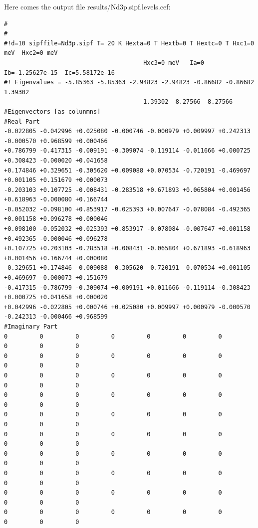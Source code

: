 \begin{enumerate}
Here comes the output file {\prg results/Nd3p.sipf.levels.cef}:
{\footnotesize
\begin{verbatim} 
#
#
#!d=10 sipffile=Nd3p.sipf T= 20 K Hexta=0 T Hextb=0 T Hextc=0 T Hxc1=0 meV  Hxc2=0 meV  
                                       Hxc3=0 meV   Ia=0  Ib=-1.25627e-15  Ic=5.58172e-16 
#! Eigenvalues = -5.85363 -5.85363 -2.94823 -2.94823 -0.86682 -0.86682  1.39302  
                                       1.39302  8.27566  8.27566 
#Eigenvectors [as colunmns]
#Real Part
-0.022805 -0.042996 +0.025080 -0.000746 -0.000979 +0.009997 +0.242313 -0.000570 +0.968599 +0.000466 
+0.786799 -0.417315 -0.009191 -0.309074 -0.119114 -0.011666 +0.000725 +0.308423 -0.000020 +0.041658 
+0.174846 +0.329651 -0.305620 +0.009088 +0.070534 -0.720191 -0.469697 +0.001105 +0.151679 +0.000073 
-0.203103 +0.107725 -0.008431 -0.283518 +0.671893 +0.065804 +0.001456 +0.618963 -0.000080 +0.166744 
-0.052032 -0.098100 +0.853917 -0.025393 +0.007647 -0.078084 -0.492365 +0.001158 +0.096278 +0.000046 
+0.098100 -0.052032 +0.025393 +0.853917 -0.078084 -0.007647 +0.001158 +0.492365 -0.000046 +0.096278 
+0.107725 +0.203103 -0.283518 +0.008431 -0.065804 +0.671893 -0.618963 +0.001456 +0.166744 +0.000080 
-0.329651 +0.174846 -0.009088 -0.305620 -0.720191 -0.070534 +0.001105 +0.469697 -0.000073 +0.151679 
-0.417315 -0.786799 -0.309074 +0.009191 +0.011666 -0.119114 -0.308423 +0.000725 +0.041658 +0.000020 
+0.042996 -0.022805 +0.000746 +0.025080 +0.009997 +0.000979 -0.000570 -0.242313 -0.000466 +0.968599 
#Imaginary Part
0         0         0         0         0         0         0         0         0         0         
0         0         0         0         0         0         0         0         0         0         
0         0         0         0         0         0         0         0         0         0         
0         0         0         0         0         0         0         0         0         0         
0         0         0         0         0         0         0         0         0         0         
0         0         0         0         0         0         0         0         0         0         
0         0         0         0         0         0         0         0         0         0         
0         0         0         0         0         0         0         0         0         0         
0         0         0         0         0         0         0         0         0         0         
0         0         0         0         0         0         0         0         0         0 
\end{verbatim}
}


\end{enumerate}
